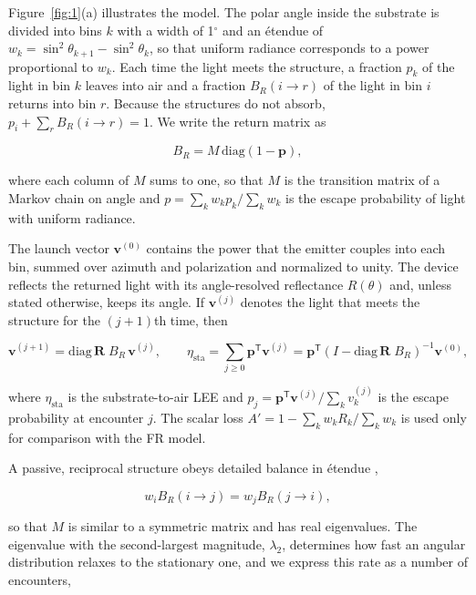 \documentclass{optica-article}
\begin{document}
Figure~\ref{fig:1}(a) illustrates the model. The polar angle inside the substrate is divided into bins $k$ with a width of 1\ensuremath{^\circ} and an étendue of $w_k = \sin^2\theta_{k+1}-\sin^2\theta_k$, so that uniform radiance corresponds to a power proportional to $w_k$. Each time the light meets the structure, a fraction $p_k$ of the light in bin $k$ leaves into air and a fraction $B_R(i\to r)$ of the light in bin $i$ returns into bin $r$. Because the structures do not absorb, $p_i + \sum_r B_R(i\to r) = 1$. We write the return matrix as

\begin{equation}
\label{eq:1}
B_R = M\,\mathrm{diag}(1-\mathbf{p}),
\end{equation}

where each column of $M$ sums to one, so that $M$ is the transition matrix of a Markov chain on angle and $p = \sum_k w_k p_k/\sum_k w_k$ is the escape probability of light with uniform radiance.

The launch vector $\mathbf{v}^{(0)}$ contains the power that the emitter couples into each bin, summed over azimuth and polarization and normalized to unity. The device reflects the returned light with its angle-resolved reflectance $R(\theta)$ and, unless stated otherwise, keeps its angle. If $\mathbf{v}^{(j)}$ denotes the light that meets the structure for the $(j+1)$th time, then

\begin{equation}
\label{eq:2}
\mathbf{v}^{(j+1)} = \mathrm{diag}\,\mathbf{R}\; B_R\,\mathbf{v}^{(j)} , \qquad \eta_{\mathrm{sta}} = \sum_{j\ge 0}\mathbf{p}^{\mathsf T}\mathbf{v}^{(j)} = \mathbf{p}^{\mathsf T}\left(I - \mathrm{diag}\,\mathbf{R}\; B_R\right)^{-1}\mathbf{v}^{(0)} ,
\end{equation}

where $\eta_{\mathrm{sta}}$ is the substrate-to-air LEE and $p_j = \mathbf{p}^{\mathsf T}\mathbf{v}^{(j)}/\sum_k v^{(j)}_k$ is the escape probability at encounter $j$. The scalar loss $A' = 1-\sum_k w_k R_k/\sum_k w_k$ is used only for comparison with the FR model.

A passive, reciprocal structure obeys detailed balance in étendue \cite{r19,r20},

\begin{equation}
\label{eq:3}
w_i B_R(i\to j) = w_j B_R(j\to i),
\end{equation}

so that $M$ is similar to a symmetric matrix and has real eigenvalues. The eigenvalue with the second-largest magnitude, $\lambda_2$, determines how fast an angular distribution relaxes to the stationary one, and we express this rate as a number of encounters,
\end{document}

